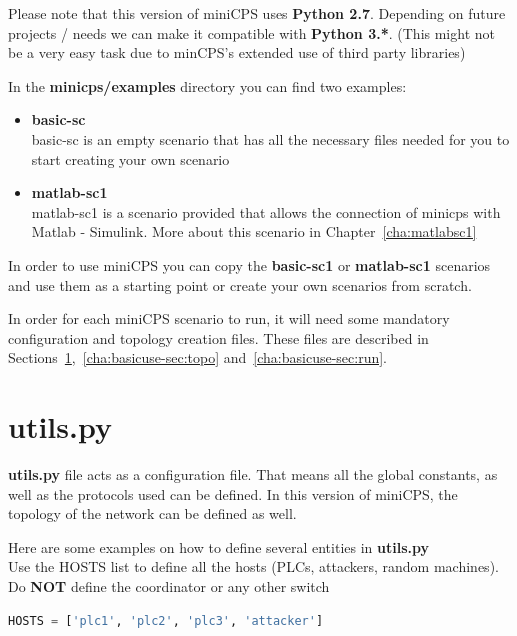 \documentclass[book,a4paper,12pt,oneside]{memoir}
\begin{document}
Please note that this version of miniCPS uses \textbf{Python 2.7}.  Depending on future projects / needs we can make it compatible with \textbf{Python 3.*}.  (This might not be a very easy task due to minCPS's extended use of third party libraries)

In the \textbf{minicps/examples} directory you can find two examples:

\begin{itemize}
  \item \textbf{basic-sc} \\ basic-sc is an empty scenario that has all the necessary files needed for you to start creating your own scenario
  \item \textbf{matlab-sc1} \\ matlab-sc1 is a scenario provided that allows the connection of minicps with Matlab - Simulink.  More about this scenario in Chapter~\ref{cha:matlabsc1}
\end{itemize}

In order to use miniCPS you can copy the \textbf{basic-sc1} or \textbf{matlab-sc1} scenarios and use them as a starting point or create your own scenarios from scratch.

In order for each miniCPS scenario to run, it will need some mandatory configuration and topology creation files.  These files are described in Sections~\ref{cha:basicuse-sec:utils},~\ref{cha:basicuse-sec:topo} and~\ref{cha:basicuse-sec:run}.

\section{utils.py}
\label{cha:basicuse-sec:utils}
\textbf{utils.py} file acts as a configuration file.  That means all the global constants, as well as the protocols used can be defined.  In this version of miniCPS, the topology of the network can be defined as well.

\noindent Here are some examples on how to define several entities in \textbf{utils.py}\\

\noindent Use the HOSTS list to define all the hosts (PLCs, attackers, random machines).  Do \textbf{NOT} define the coordinator or any other switch

\begin{lstlisting}[backgroundcolor = \color{ultralightgray}, language = Python, xleftmargin = 0.1cm, framexleftmargin = 0.3em, showstringspaces=false]
HOSTS = ['plc1', 'plc2', 'plc3', 'attacker']
\end{lstlisting}
\end{document}
